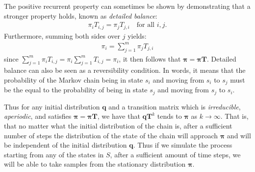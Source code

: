The positive recurrent property can sometimes be shown by demonstrating that a stronger property holds, known as
\textit{detailed balance}:
\begin{align} 
\pi_i T_{i, j} = \pi_j T_{j, i} \quad \text{for all \(i, j\)}.
\end{align}
Furthermore, summing both sides over \(j\) yields:
\begin{align} 
\pi_i = \sum_{j=1}^m \pi_j T_{j, i}
\label{eq:discreteProb}
\end{align}
since \(\sum_{j=1}^m \pi_i T_{i, j} = \pi_i \sum_{j=1}^m T_{i, j} = \pi_i\), it then follows that \(\boldsymbol{\pi} =
\boldsymbol{\pi} \boldsymbol{T}\). Detailed balance can also be seen as a reversibility condition. In words, it means
that the probability of the Markov chain being in state \(s_i\) and moving from \(s_i\) to \(s_j\) must be the equal to
the probability of being in state \(s_j\) and moving from \(s_j\) to \(s_i\).


Thus for any initial distribution \(\boldsymbol{q}\) and a transition matrix which is \textit{irreducible},
\textit{aperiodic}, and satisfies \(\boldsymbol{\pi} = \boldsymbol{\pi} \boldsymbol{T}\), we have that \(\boldsymbol{q}
\boldsymbol{T}^k\) tends to \(\boldsymbol{\pi}\) as \(k \rightarrow \infty\). That is, that no matter what the initial
distribution of the chain is, after a sufficient number of steps the distribution of the state of the chain will
approach \(\boldsymbol{\pi}\) and will be independent of the initial distribution \(\boldsymbol{q}\). Thus if we
simulate the process starting from any of the states in \(S\), after a sufficient amount of time steps, we will be able
to take samples from the stationary distribution \(\boldsymbol{\pi}\).

